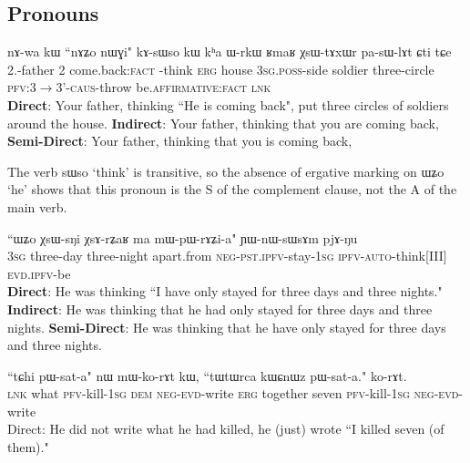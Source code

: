 \documentclass[oneside,a4paper,11pt]{article}
\newcommand{\ipa}[1]{{\phon #1}} %
\begin{document}
 
 \subsection{Pronouns}

   \begin{exe}
\ex \label{ex:nWGi.kAsWso}
\gll 
\ipa{nɤ-wa}  	\ipa{kɯ}  	{``\ipa{nɤʑo}} 	\ipa{nɯɣi}"  	\ipa{kɤ-sɯso}  	\ipa{kɯ}  	\ipa{kʰa}  	\ipa{ɯ-rkɯ}  	\ipa{ʁmaʁ}  	\ipa{χsɯ-tɤxɯr}  	\ipa{pa-sɯ-lɤt}  	\ipa{ɕti}  	\ipa{tɕe}  \\
{2\sg.\poss-father} {\erg} {2\sg} {come.back:\textsc{fact}}  \infin-think \textsc{erg} house \textsc{3sg.poss}-side soldier three-circle \textsc{pfv:3$\rightarrow$3'-caus}-throw be.\textsc{affirmative}:\textsc{fact} \textsc{lnk}\\
\glt \textbf{Direct}: Your father, thinking ``{He} {is coming back}",   put three circles of soldiers around the house. 
\glt  \textbf{Indirect}: Your father, thinking that {you} are coming back,
\glt  \textbf{Semi-Direct}: Your father, thinking that {you} {is coming back}, 
\end{exe}
   
The verb \ipa{sɯso} `think' is transitive, so the absence of ergative marking on \ipa{ɯʑo} `he' shows that this pronoun is the S of the complement clause, not the A of the main verb.
      
\begin{exe}
\ex
\gll  ``{\ipa{ɯʑo}}  	\ipa{χsɯ-sŋi}  	\ipa{χsɤ-rʑaʁ}  	\ipa{ma}  	{\ipa{mɯ-pɯ-rɤʑi-a}}"  	\ipa{ɲɯ-nɯ-sɯsɤm}  	\ipa{pjɤ-ŋu}  \\
{\textsc{3sg}} three-day  three-night apart.from {\textsc{neg-pst.ipfv}-stay-\textsc{1sg}} \textsc{ipfv-auto}-think[III] \textsc{evd.ipfv}-be \\
\glt    \textbf{Direct}: He was thinking ``{I} {have} only {stayed} for three days and three nights."
\glt    \textbf{Indirect}: He was thinking that {he} had only stayed for three days and three nights.
\glt  \textbf{Semi-Direct}: He was thinking that {he} {have} only {stayed} for three days and three nights. 
\end{exe}
  
 
 
  
\begin{exe}
\ex
\gll \ipa{tɕe}  	``{\ipa{tɕhi}}  	{\ipa{pɯ-sat-a}}"  	\ipa{nɯ}  	\ipa{mɯ-ko-rɤt}  	\ipa{kɯ,}  	``\ipa{tɯtɯrca}  	\ipa{kɯɕnɯz}  	\ipa{pɯ-sat-a.}"  	\ipa{ko-rɤt.}  \\
\textsc{lnk} {what} {\textsc{pfv}-kill-\textsc{1sg}}  \textsc{dem} \textsc{neg-evd}-write \textsc{erg} together seven \textsc{pfv}-kill-\textsc{1sg} \textsc{neg-evd}-write \\
\glt Direct: He did not write {what} he had killed,  he (just) wrote ``I killed seven (of them)."
 \end{exe}
 
\end{document}
